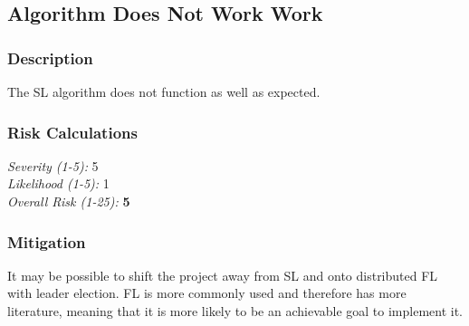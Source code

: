 \subsection{Algorithm Does Not Work Work}
\subsubsection{Description}
The SL algorithm does not function as well as expected.

\subsubsection{Risk Calculations}
\emph{Severity (1-5):} 5 \\
\emph{Likelihood (1-5):} 1 \\
\emph{Overall Risk (1-25):} \textbf{5}

\subsubsection{Mitigation}
It may be possible to shift the project away from SL and onto distributed FL with leader election. FL is more commonly used and therefore has more literature, meaning that it is more likely to be an achievable goal to implement it.